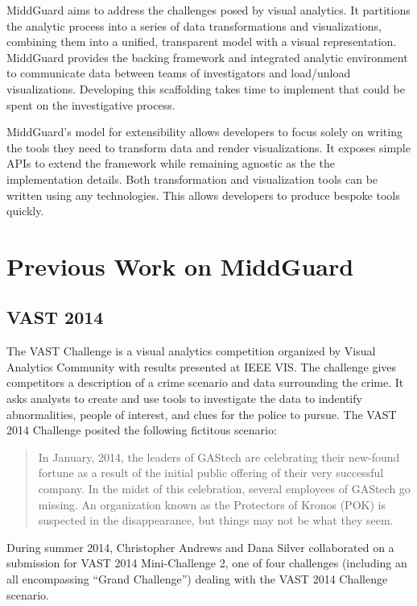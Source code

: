 \documentclass[midd]{thesis}
\begin{document}
MiddGuard aims to address the challenges posed by visual analytics. It
partitions the analytic process into a series of data transformations and
visualizations, combining them into a unified, transparent model with a visual
representation. MiddGuard provides the backing framework and integrated analytic
environment to communicate data between teams of investigators and load/unload
visualizations. Developing this scaffolding takes time to implement that could
be spent on the investigative process.

MiddGuard's model for extensibility allows developers to focus solely on writing
the tools they need to transform data and render visualizations. It exposes
simple APIs to extend the framework while remaining agnostic as the the
implementation details. Both transformation and visualization tools can be
written using any technologies. This allows developers to produce bespoke tools
quickly.

\section{Previous Work on MiddGuard}

\subsection{VAST 2014}

The VAST Challenge is a visual analytics competition organized by Visual
Analytics Community with results presented at IEEE VIS. The challenge gives
competitors a description of a crime scenario and data surrounding the crime. It
asks analysts to create and use tools to investigate the data to indentify
abnormalities, people of interest, and clues for the police to pursue. The VAST
2014 Challenge \cite{vast2014} posited the following fictitous scenario:

\begin{quote}
In January, 2014, the leaders of GAStech are celebrating their new-found fortune
as a result of the initial public offering of their very successful company. In
the midst of this celebration, several employees of GAStech go missing. An
organization known as the Protectors of Kronos (POK) is suspected in the
disappearance, but things may not be what they seem.
\end{quote}

During summer 2014, Christopher Andrews and Dana Silver collaborated on a
submission for VAST 2014 Mini-Challenge 2, one of four challenges (including an
all encompassing ``Grand Challenge'') dealing with the VAST 2014 Challenge
scenario.
\end{document}
